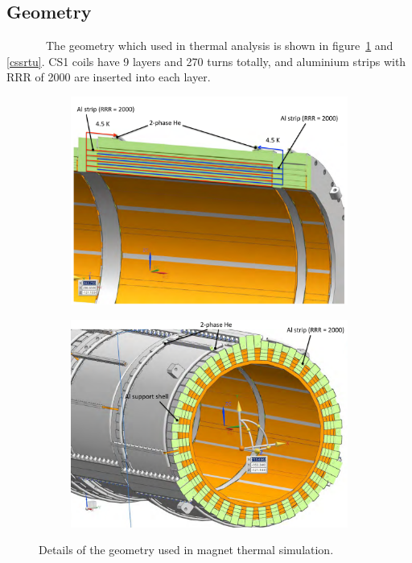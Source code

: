   \subsection{Geometry}
~~~~~~~The geometry which used in thermal analysis is shown in figure~\ref{4geo} and \ref{cssrtu}.
CS1 coils have 9 layers and 270 turns totally, and aluminium strips with RRR of 2000 are inserted into each layer.
 \begin{figure}[H]
   \begin{subfigure}{0.3\textwidth}
    \centering
    \includegraphics[scale=0.29]{chapter5/fig/geo.pdf}
   \end{subfigure}
   \hspace{0.2\textwidth}
   \begin{subfigure}{0.3\textwidth}
    \centering
	\includegraphics[scale=0.29]{chapter5/fig/geo2.pdf}
   \end{subfigure}
   \caption{Details of the geometry used in magnet thermal simulation.}
   \label{4geo}
  \end{figure}

